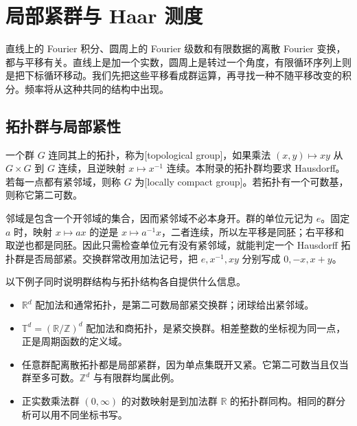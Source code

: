 \section{局部紧群与 Haar 测度}
\label{b2:sec:I201}

直线上的 Fourier 积分、圆周上的 Fourier 级数和有限数据的离散 Fourier 变换，都与平移有关。直线上是加一个实数，圆周上是转过一个角度，有限循环序列上则是把下标循环移动。我们先把这些平移看成群运算，再寻找一种不随平移改变的积分。频率将从这种共同的结构中出现。

\subsection{拓扑群与局部紧性}
\label{b2:subsec:I20101}

\begin{definition}[拓扑群与局部紧群]
\label{b2:def:I1-topological-group}
一个群 \(G\) 连同其上的拓扑，称为[topological group]，如果乘法 \((x,y)\mapsto xy\) 从 \(G\times G\) 到 \(G\) 连续，且逆映射 \(x\mapsto x^{-1}\) 连续。本附录的拓扑群均要求 Hausdorff。若每一点都有紧邻域，则称 \(G\) 为[locally compact group]。若拓扑有一个可数基，则称它第二可数。
\end{definition}

邻域是包含一个开邻域的集合，因而紧邻域不必本身开。群的单位元记为 \(e\)。固定 \(a\) 时，映射 \(x\mapsto ax\) 的逆是 \(x\mapsto a^{-1}x\)，二者连续，所以左平移是同胚；右平移和取逆也都是同胚。因此只需检查单位元有没有紧邻域，就能判定一个 Hausdorff 拓扑群是否局部紧。交换群常改用加法记号，把 \(e,x^{-1},xy\) 分别写成 \(0,-x,x+y\)。

以下例子同时说明群结构与拓扑结构各自提供什么信息。
\begin{itemize}
\item \(\mathbb R^d\) 配加法和通常拓扑，是第二可数局部紧交换群；闭球给出紧邻域。
\item \(\mathbb T^d=(\mathbb R/\mathbb Z)^d\) 配加法和商拓扑，是紧交换群。相差整数的坐标视为同一点，正是周期函数的定义域。
\item 任意群配离散拓扑都是局部紧群，因为单点集既开又紧。它第二可数当且仅当群至多可数。\(\mathbb Z^d\) 与有限群均属此例。
\item 正实数乘法群 \((0,\infty)\) 的对数映射是到加法群 \(\mathbb R\) 的拓扑群同构。相同的群分析可以用不同坐标书写。
\end{itemize}

